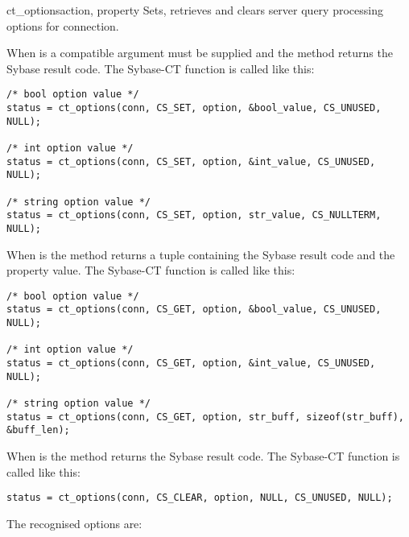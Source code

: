 \begin{methoddesc}[CS_CONNECTION]{ct_options}{action, property }
Sets, retrieves and clears server query processing options for
connection.

When  is  a compatible  argument
must be supplied and the method returns the Sybase result code.  The
Sybase-CT  function is called like this:

\begin{verbatim}
/* bool option value */
status = ct_options(conn, CS_SET, option, &bool_value, CS_UNUSED, NULL);

/* int option value */
status = ct_options(conn, CS_SET, option, &int_value, CS_UNUSED, NULL);

/* string option value */
status = ct_options(conn, CS_SET, option, str_value, CS_NULLTERM, NULL);
\end{verbatim}

When  is  the method returns a tuple
containing the Sybase result code and the property value.  The
Sybase-CT  function is called like this:

\begin{verbatim}
/* bool option value */
status = ct_options(conn, CS_GET, option, &bool_value, CS_UNUSED, NULL);

/* int option value */
status = ct_options(conn, CS_GET, option, &int_value, CS_UNUSED, NULL);

/* string option value */
status = ct_options(conn, CS_GET, option, str_buff, sizeof(str_buff), &buff_len);
\end{verbatim}

When  is  the method returns the Sybase
result code.  The Sybase-CT  function is called
like this:

\begin{verbatim}
status = ct_options(conn, CS_CLEAR, option, NULL, CS_UNUSED, NULL);
\end{verbatim}

The recognised options are:


\end{methoddesc}
